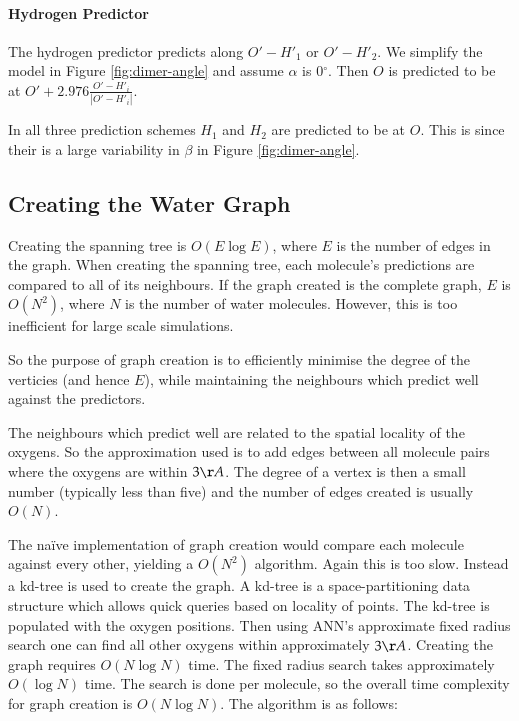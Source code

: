 \documentclass[a4paper]{report}
\newcommand{\degree}{\ensuremath{^\circ}}
\begin{document}
\paragraph{Hydrogen Predictor}
The hydrogen predictor predicts along $O'-H'_1$ or $O'-H'_2$. We simplify the
model in Figure \ref{fig:dimer-angle} and assume $\alpha$ is $0\degree$. Then
$O$ is predicted to be at $O' + 2.976\frac{O'-H'_i}{|O'-H'_i|}$.

In all three prediction schemes $H_1$ and $H_2$ are predicted to be at
$O$. This is since their is a large variability in $\beta$ in Figure
\ref{fig:dimer-angle}.


\subsection{Creating the Water Graph}

Creating the spanning tree is $O(E \log E)$, where $E$ is the number of edges
in the graph. When creating the spanning tree, each molecule's predictions are
compared to all of its neighbours. If the graph created is the complete graph,
$E$ is $O(N^2)$, where $N$ is the number of water molecules. However, this is
too inefficient for large scale simulations.

So the purpose of graph creation is to efficiently minimise the degree of the
verticies (and hence $E$), while maintaining the neighbours which predict well
against the predictors.

The neighbours which predict well are related to the spatial locality of the
oxygens. So the approximation used is to add edges between all molecule pairs
where the oxygens are within $3\AA$. The degree of a vertex is then a small
number (typically less than five) and the number of edges created is usually
$O(N)$.

The na\"{i}ve implementation of graph creation would compare each molecule
against every other, yielding a $O(N^2)$ algorithm. Again this is too
slow. Instead a kd-tree \citep{cormen2001introduction} is used to create the
graph. A kd-tree is a space-partitioning data structure which allows quick
queries based on locality of points. The kd-tree is populated with the oxygen
positions. Then using ANN's approximate fixed radius search one can find all
other oxygens within approximately $3\AA$. Creating the graph requires $O(N
\log N)$ time. The fixed radius search takes approximately $O(\log N)$
time. The search is done per molecule, so the overall time complexity for
graph creation is $O(N \log N)$. The algorithm is as follows:
\end{document}
